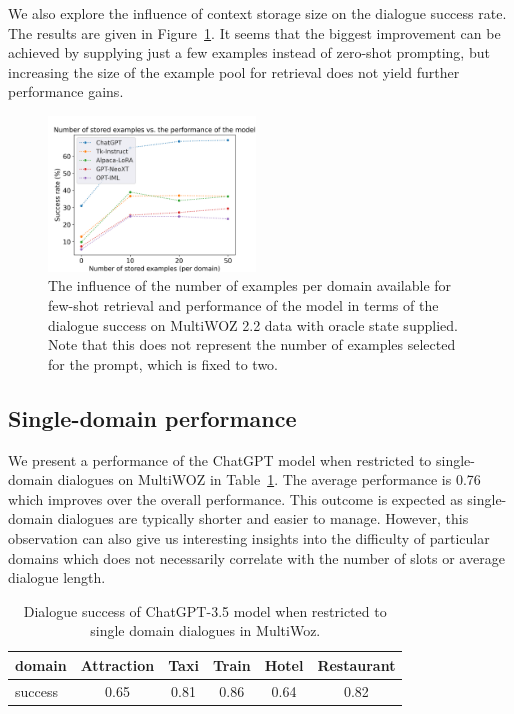 We also explore the influence of context storage size on the dialogue success rate.
The results are given in Figure~\ref{07:fig:shots}.
It seems that the biggest improvement can be achieved by supplying just a few examples instead of zero-shot prompting, but increasing the size of the example pool for retrieval does not yield further performance gains.
\begin{figure}[h]
    \centering
    \includegraphics[width=0.49\textwidth]{images/shots.png}
    \caption{The influence of the number of examples per domain available for few-shot retrieval and performance of the model in terms of the dialogue success on MultiWOZ 2.2 data with oracle state supplied. Note that this does not represent the number of examples selected for the prompt, which is fixed to two.}
    \label{07:fig:shots}
\end{figure}

\subsection{Single-domain performance}
We present a performance of the ChatGPT model when restricted to single-domain dialogues on MultiWOZ in Table~\ref{tab:single-domain}.
The average performance is 0.76 which improves over the overall performance.
This outcome is expected as single-domain dialogues are typically shorter and easier to manage.
However, this observation can also give us interesting insights into the difficulty of particular domains which does not necessarily correlate with the number of slots or average dialogue length.
\begin{table}[tp]
    \centering
    \begin{tabular}{lccccc}
    \toprule
       domain  &  Attraction & Taxi & Train & Hotel & Restaurant \\ 
    \midrule
        success & 0.65 & 0.81 & 0.86 & 0.64 & 0.82 \\
    \bottomrule
    \end{tabular}
    \caption{Dialogue success of ChatGPT-3.5 model when restricted to single domain dialogues in MultiWoz.}
    \label{tab:single-domain}
\end{table}
